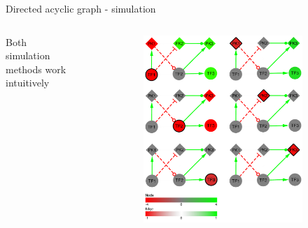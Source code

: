 \begin{frame}{Directed acyclic graph - simulation}
\begin{columns}
\begin{column}{0.2\textwidth}
Both simulation methods work intuitively
\end{column}
\begin{column}{0.8\textwidth}
\begin{figure}[ht]
\centering
\begin{subfigure}[b]{0.44\textwidth}\centering\caption{}
\includegraphics[width=\textwidth]{analysis/fig/prim.pdf}
\end{subfigure}
\hfill
\begin{subfigure}[b]{0.44\textwidth}\centering\caption{}

\end{subfigure}
\end{figure}
\end{column}
\end{columns}
\end{frame}
